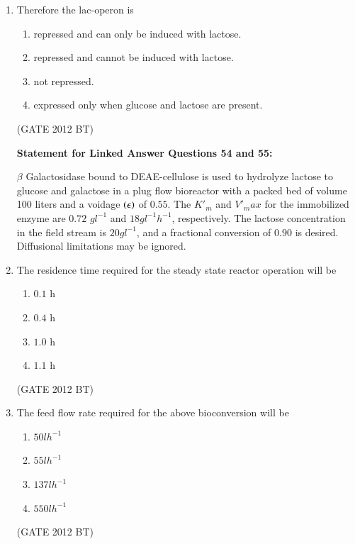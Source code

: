 \documentclass[journal,12pt,onecolumn]{IEEEtran}
\theoremstyle{remark}
\begin{document}
\begin{enumerate}
\item Therefore the lac-operon is
\begin{multicols}{2}
\begin{enumerate}
\item repressed and can only be induced with lactose.
\item 	repressed and cannot be induced with lactose.
\item 	not repressed.
\item 	expressed only when glucose and lactose are present.
\end{enumerate}
\end{multicols} \hfill(GATE 2012 BT)


\textbf{Statement for Linked Answer Questions 54 and 55:}

$\beta$ Galactosidase bound to DEAE-cellulose is used to hydrolyze lactose to glucose and galactose in a plug flow bioreactor with a packed bed of volume 100 liters and a voidage $\left(\epsilon\right)$ of $0.55$. The $K'_m$ and $V'_max$ for the immobilized enzyme are $0.72$ $gl^{-1}$ and $18 gl^{-1}h^{-1}$, respectively. The lactose concentration in the field stream is $20 gl^{-1}$, and a fractional conversion of $0.90$ is desired. Diffusional limitations may be ignored.\\
\item The residence time required for the steady state reactor operation will be
\begin{multicols}{4}
\begin{enumerate}
\item $0.1$ h	
\item $0.4$ h	
\item $1.0$ h	
\item  $1.1$ h
\end{enumerate}
\end{multicols} \hfill(GATE 2012 BT)

\item The feed flow rate required for the above bioconversion will be
\begin{multicols}{4}
\begin{enumerate}
\item  $50 lh^{-1}$	
\item  $55lh^{-1}$
\item  $137lh^{-1}$	
\item  $550lh^{-1}$
\end{enumerate}
\end{multicols} \hfill(GATE 2012 BT)




\end{enumerate}
\end{document}
